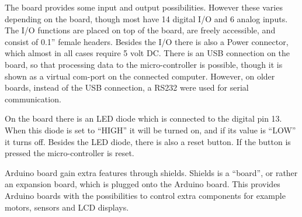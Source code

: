 The board provides some input and output possibilities. However these varies depending on the board, though most have 14 digital I/O and 6 analog inputs. The I/O functions are placed on top of the board, are freely accessible, and consist of 0.1'' female headers. Besides the I/O there is also a Power connector, which almost in all cases require 5 volt DC. There is an USB connection on the board, so that processing data to the micro-controller is possible, though it is shown as a virtual com-port on the connected computer. However, on older boards, instead of the USB connection, a RS232 were used for serial communication. 

On the board there is an LED diode which is connected to the digital pin 13. When this diode is set to ``HIGH'' it will be turned on, and if its value is ``LOW'' it turns off. Besides the LED diode, there is also a reset button. If the button is pressed the micro-controller is reset. 

Arduino board gain extra features through shields. Shields is a ``board'', or rather an expansion board, which is plugged onto the Arduino board. This provides Arduino boards with the possibilities to control extra components for example motors, sensors and LCD displays.

